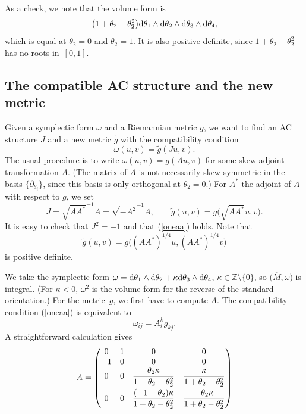 \documentclass[10pt,a4paper]{amsart}
\numberwithin{equation}{section}
\theoremstyle{definition}
\newcommand{\BbZ}{{\mathbb Z}}
\newcommand{\Z}{\BbZ}
\newcommand{\om}{\overline{M}}
\newcommand{\tg}{\tilde g}
\begin{document}
As a check, we note that the volume form is
\[ \bigl(1+\theta_2-\theta_2^2\bigr){\rm d}\theta_1\wedge {\rm d}\theta_2 \wedge {\rm d}\theta_3\wedge {\rm d}\theta_4,\]
which is equal at $\theta_2=0$ and $\theta_2 = 1$. It is also positive definite, since $1+\theta_2-\theta_2^2$ has no roots in~$[0,1]$.

\subsection{The compatible AC structure and the new metric}%

Given a symplectic form $\omega$ and a Riemannian metric $g$, we want to find an AC structure $J$ and a new metric $\tg$ with the compatibility condition
\begin{equation}\label{oneaa}\omega(u,v) = \tg(Ju,v).
\end{equation}
 The usual procedure is to write
$\omega(u,v) = g(Au, v)$
for some skew-adjoint transformation $A$. (The matrix of $A$ is not necessarily skew-symmetric in the
basis $\{\partial_{\theta_i}\}$, since this basis is only orthogonal at $\theta_2=0$.)
For $A^*$
the adjoint of $A$ with respect to $g$, we set
\begin{equation*}%
J = \sqrt{AA^*}^{-1}A = \sqrt{-A^2}^{-1}A,\qquad \tg(u,v) = g\bigl(\sqrt{AA^*}u,v\bigr).
\end{equation*}
It is easy to check that $J^2 = -1$ and that (\ref{oneaa}) holds. Note that
\[
\tg(u,v) = g\bigl((AA^*)^{1/4}u,(AA^*)^{1/4}v\bigr)
\]
is positive definite.

We take the symplectic form $\omega = {\rm d}\theta_1\wedge {\rm d}\theta_2 + \kappa {\rm d}\theta_3\wedge {\rm d}\theta_4$, $\kappa\in \Z\setminus \{0\}$, so $\bigl(\om,\omega\bigr)$ is integral. \big(For $\kappa <0$, $\omega^2$ is the volume form for the reverse of the standard orientation.\big) For the metric~$g$, we first have to compute $A$. The compatibility condition (\ref{oneaa}) is equivalent to
\begin{equation*}%
\omega_{ij} = A^k_i g_{kj}.
\end{equation*}
A straightforward calculation gives
\[A = \begin{pmatrix} 0&1&0&0\\
-1&0&0&0\\
0&0& \dfrac{\theta_2\kappa}{1+\theta_2-\theta_2^2}& \dfrac{\kappa}{1+\theta_2-\theta_2^2}\vspace{1mm}\\
0&0&\dfrac{(-1-\theta_2)\kappa}{1+\theta_2-\theta_2^2}& \dfrac{-\theta_2\kappa}{1+\theta_2-\theta_2^2}
\end{pmatrix}\]
\end{document}

